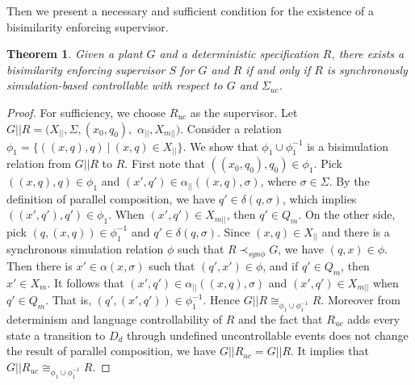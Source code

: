 \documentclass[preprint,authoryear,12pt]{elsarticle}
\newtheorem{Theorem}{Theorem}
\begin{document}
Then we present a necessary and sufficient condition for the
existence of a bisimilarity enforcing supervisor.

\begin{Theorem}\label{t}
Given a plant $G$ and a deterministic specification $R$, there
exists a bisimilarity enforcing supervisor $S$ for $G$ and $R$ if
and only if $R$ is synchronously simulation-based controllable
with respect to $G$ and $\Sigma_{uc}$.
\end{Theorem}

\begin{proof}
For sufficiency, we choose $R_{uc}$ as the supervisor. Let
$G||R=(X_{||}, \Sigma, (x_0, q_0),$ $ \alpha_{||},X_{m||})$.
Consider a relation $\phi_1=\{((x, q), q) ~|~ (x, q) \in
X_{||}\}$. We show that $\phi_1 \cup \phi_1^{-1}$ is a
bisimulation relation from $G||R$ to $R$. First note that $((x_0,
q_0), q_0) \in \phi_1$. Pick $((x, q), q) \in \phi_1$ and $(x',
q') \in \alpha_{||}((x, q), \sigma)$, where $\sigma \in \Sigma$.
By the definition of parallel composition, we have $q' \in
\delta(q, \sigma)$, which implies $((x', q'), q') \in \phi_1$.
When $(x', q') \in X_{m||}$, then $q' \in Q_{m}$. On the other
side, pick $(q, (x, q)) \in \phi_1^{-1}$ and $q' \in \delta(q,
\sigma)$. Since $(x, q) \in X_{||}$ and there is a synchronous
simulation relation $\phi$ such that $R \prec_{syn\phi} G$, we
have $(q, x) \in \phi$. Then there is $x' \in \alpha(x, \sigma)$
such that $(q', x') \in \phi$, and if $q' \in Q_{m}$, then $x' \in
X_{m}$. It follows that $(x', q') \in \alpha_{||}((x, q), \sigma)$
and $(x', q') \in X_{m||}$ when $q' \in Q_{m}$. That is, $(q',
(x', q')) \in \phi_{1}^{-1}$. Hence $G || R \cong_{\phi_1 \cup
\phi_1^{-1}} R$. Moreover from determinism and language
controllability of $R$ and the fact that $R_{uc}$ adds every state
a transition to $D_d$ through undefined uncontrollable events does
not change the result of parallel composition, we have
$G||R_{uc}=G||R$. It implies that $G||R_{uc} \cong_{\phi_1 \cup
\phi_1^{-1}}R$.


\end{proof}
\end{document}
